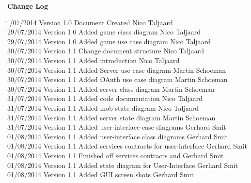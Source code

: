 \documentclass[letterpaper]{article}
\begin{document}

	\newpage
		{\LARGE \bf Change Log}\\[2em]
		
		\begin{tabbing}
			\hspace*{2.5cm}\=\hspace*{2.5cm}\=\hspace*{8cm}\=\hspace*{3cm} /07/2014	\> Version 1.0	\> Document Created 							\> Nico Taljaard \\
			29/07/2014	\> Version 1.0	\> Added game class diagram						\> Nico Taljaard \\
			29/07/2014	\> Version 1.0	\> Added game use case diagram					\> Nico Taljaard \\
			30/07/2014	\> Version 1.1	\> Change document structure					\> Nico Taljaard \\
			30/07/2014	\> Version 1.1	\> Added introduction							\> Nico Taljaard \\
			30/07/2014  \> Version 1.1  \> Added Server use case diagram				\> Martin Schoeman\\
			30/07/2014  \> Version 1.1  \> Added OAuth use case diagram					\> Martin Schoeman\\
			30/07/2014  \> Version 1.1  \> Added server class diagram					\> Martin Schoeman\\
			31/07/2014  \> Version 1.1  \> Added code documentation						\> Nico Taljaard\\
			31/07/2014  \> Version 1.1  \> Added mob state diagram						\> Nico Taljaard\\
			31/07/2014  \> Version 1.1  \> Added server state diagram					\> Martin Schoeman\\
			31/07/2014  \> Version 1.1  \> Added user-interface case diagrams			\> Gerhard Smit\\
			01/08/2014  \> Version 1.1  \> Added user-interface class diagrams			\> Gerhard Smit\\
			01/08/2014  \> Version 1.1  \> Added services contracts for user-interface 	\> Gerhard Smit\\
			01/08/2014  \> Version 1.1  \> Finished off services contracts and 			\> Gerhard Smit\\
			01/08/2014	\> Version 1.1	\> Added state diagram for User-Interface 		\> Gerhard Smit\\
			01/08/2014  \> Version 1.1  \> Added GUI screen shots						\> Gerhard Smit\\

\end{tabbing}
\end{document}
